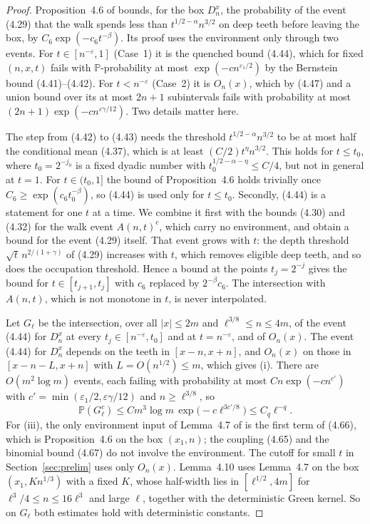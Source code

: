 \documentclass[11pt]{amsart}
\theoremstyle{remark}
\numberwithin{equation}{section}
\newcommand{\PP}{\mathbb{P}}
\begin{document}
\begin{proof}
Proposition~4.6 of \cite{DNNS} bounds, for the box $D^x_n$, the probability of the event (4.29) that the walk spends less than $t^{1/2-\alpha}n^{3/2}$ on deep teeth before leaving the box, by $C_6\exp(-c_6t^{-\beta})$. Its proof uses the environment only through two events. For $t\in[n^{-\varepsilon},1]$ (Case~1) it is the quenched bound (4.44), which for fixed $(n,x,t)$ fails with $\PP$-probability at most $\exp(-cn^{\varepsilon_1/2})$ by the Bernstein bound (4.41)--(4.42). For $t<n^{-\varepsilon}$ (Case~2) it is $O_n(x)$, which by (4.47) and a union bound over its at most $2n+1$ subintervals fails with probability at most $(2n+1)\exp(-cn^{\varepsilon\gamma/12})$. Two details matter here.

The step from (4.42) to (4.43) needs the threshold $t^{1/2-\alpha}n^{3/2}$ to be at most half the conditional mean (4.37), which is at least $(C/2)t^\eta n^{3/2}$. This holds for $t\le t_0$, where $t_0=2^{-j_0}$ is a fixed dyadic number with $t_0^{1/2-\alpha-\eta}\le C/4$, but not in general at $t=1$. For $t\in(t_0,1]$ the bound of Proposition~4.6 holds trivially once $C_6\ge\exp(c_6t_0^{-\beta})$, so (4.44) is used only for $t\le t_0$. Secondly, (4.44) is a statement for one $t$ at a time. We combine it first with the bounds (4.30) and (4.32) for the walk event $A(n,t)^c$, which carry no environment, and obtain a bound for the event (4.29) itself. That event grows with $t$: the depth threshold $\sqrt t\,n^{2/(1+\gamma)}$ of (4.29) increases with $t$, which removes eligible deep teeth, and so does the occupation threshold. Hence a bound at the points $t_j=2^{-j}$ gives the bound for $t\in[t_{j+1},t_j]$ with $c_6$ replaced by $2^{-\beta}c_6$. The intersection with $A(n,t)$, which is not monotone in $t$, is never interpolated.

Let $G_\ell$ be the intersection, over all $|x|\le2m$ and $\ell^{3/8}\le n\le4m$, of the event (4.44) for $D^x_n$ at every $t_j\in[n^{-\varepsilon},t_0]$ and at $t=n^{-\varepsilon}$, and of $O_n(x)$. The event (4.44) for $D^x_n$ depends on the teeth in $[x-n,x+n]$, and $O_n(x)$ on those in $[x-n-L,x+n]$ with $L=O(n^{1/2})\le m$, which gives (i). There are $O(m^2\log m)$ events, each failing with probability at most $Cn\exp(-cn^{c'})$ with $c'=\min(\varepsilon_1/2,\varepsilon\gamma/12)$ and $n\ge\ell^{3/8}$, so
\[
\PP(G_\ell^c)\le Cm^3\log m\,\exp\bigl(-c\ell^{3c'/8}\bigr)\le C_q\ell^{-q}.
\]
For (iii), the only environment input of Lemma~4.7 of \cite{DNNS} is the first term of (4.66), which is Proposition~4.6 on the box $(x_1,n)$; the coupling (4.65) and the binomial bound (4.67) do not involve the environment. The cutoff for small $t$ in Section~\ref{sec:prelim} uses only $O_n(x)$. Lemma~4.10 uses Lemma~4.7 on the box $(x_1,Kn^{1/3})$ with a fixed $K$, whose half-width lies in $[\ell^{1/2},4m]$ for $\ell^3/4\le n\le16\ell^3$ and large $\ell$, together with the deterministic Green kernel. So on $G_\ell$ both estimates hold with deterministic constants.
\end{proof}
\end{document}

